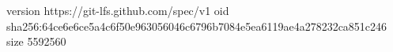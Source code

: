 version https://git-lfs.github.com/spec/v1
oid sha256:64ce6e6ce5a4c6f50e963056046c6796b7084e5ea6119ae4a278232ca851c246
size 5592560
